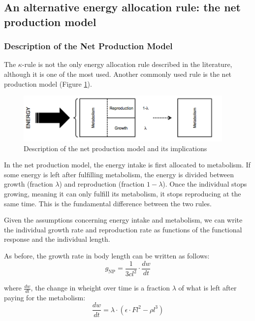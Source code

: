 \subsection{An alternative energy allocation rule: the net production
model}\label{subsec:SupMat4}

\subsubsection{Description of the Net Production Model}

The $\kappa$-rule is not the only energy allocation rule described in the
literature, although it is one of the most used. Another commonly used rule is the net
production model (Figure \ref{Fig4-SM7}).

\begin{figure}[!h] %
\centering
\includegraphics[width=0.95\textwidth]{4_ChapThe1/Fig/FigSM7}
\caption[Details of the Net
Production model]{Description of the net production model and its implications}
\label{Fig4-SM7}
\end{figure}

In the net production model, the energy intake is first allocated to metabolism.
If some energy is left after fulfilling metabolism, the energy is divided
between growth (fraction $\lambda$) and reproduction (fraction $1-\lambda$).
Once the individual stops growing, meaning it can only fulfill its metabolism, it stops
reproducing at the same time. This is the fundamental difference between the two
rules.

Given the assumptions concerning energy intake and metabolism, we can write the
individual growth rate and reproduction rate as functions of the functional
response and the individual length.

As before, the growth rate in body length can be written as follows:
\[
g_{\text{NP}}=\frac{1}{3cl^{2}}\cdot\frac{dw}{dt}
\]


where $\frac{dw}{dt}$, the change in wheight over time is a fraction
$\lambda$ of what is left after paying for the metabolism: 
\[
\frac{dw}{dt}=\lambda\cdot\left(\epsilon\cdot Fl^{2}-\rho l^{3}\right)
\]


